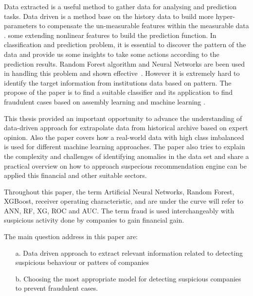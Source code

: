 Data extracted is a useful method to gather data for analysing and prediction tasks. Data driven is a method base on the history data to build more hyper-parameters to compensate the un-measurable features within the measurable data \cite{SMARRA20181252}. some extending nonlinear features to build the prediction function. In classification and prediction problem, it is essential to discover the pattern of the data and provide us some insights to take some actions according to the prediction results. Random Forest algorithm and Neural Networks are been used in handling this problem and shown effective~\cite{10.1145/3414274.3414278, RB2021}. However it is extremely hard to identify the target information from institutions data based on pattern. The propose of the paper is to find a suitable classifier and its application to find fraudulent cases based on assembly learning and machine learning .






This thesis provided an important opportunity to advance the understanding of data-driven approach for extrapolate data from historical archive based on expert opinion. Also the paper covers how a real-world data with high class imbalanced is used for different machine learning approaches. The paper also tries to explain the complexity and challenges of identifying anomalies in the data set and share a practical overview on how to approach suspecious recommendation engine can be applied this financial and other suitable sectors.





Throughout this paper, the term Artificial Neural Networks, Random Forest, XGBoost, receiver operating characteristic, and are under the curve will refer to ANN, RF, XG, ROC and AUC. The term fraud is used interchangeably with suspicious activity done by companies to gain financial gain.



The main question address in this paper are:
\begin{itemize}
    \item[a.] Data driven approach to extract relevant information related to detecting suspicious behaviour or patters of companies
    \item[b.] Choosing the most appropriate model for detecting suspicious companies to prevent fraudulent cases.
\end{itemize}

